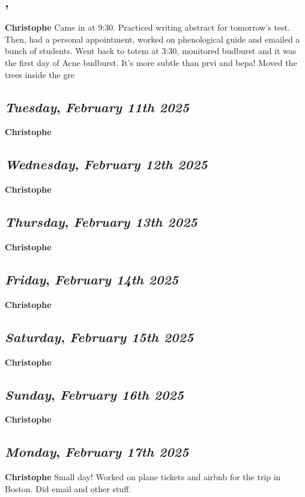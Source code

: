 \subsection*{\weekday, \day}
\textbf {Christophe}
Came in at 9:30. Practiced writing abstract for tomorrow's test. Then, had a personal appointment, worked on phenological guide and emailed a bunch of students. Went back to totem at 3:30, monitored budburst and it was the first day of Acne budburst. It's more subtle than prvi and bepa! Moved the trees inside the gre
\def\day{\textit{February 11th 2025}}
\def\weekday{\textit{Tuesday}}
\subsection*{\weekday, \day}
\textbf {Christophe}

\def\day{\textit{February 12th 2025}}
\def\weekday{\textit{Wednesday}}
\subsection*{\weekday, \day}
\textbf {Christophe}

\def\day{\textit{February 13th 2025}}
\def\weekday{\textit{Thursday}}
\subsection*{\weekday, \day}
\textbf {Christophe}

\def\day{\textit{February 14th 2025}}
\def\weekday{\textit{Friday}}
\subsection*{\weekday, \day}
\textbf {Christophe}

\def\day{\textit{February 15th 2025}}
\def\weekday{\textit{Saturday}}
\subsection*{\weekday, \day}
\textbf {Christophe}

\def\day{\textit{February 16th 2025}}
\def\weekday{\textit{Sunday}}
\subsection*{\weekday, \day}
\textbf {Christophe}

\def\day{\textit{February 17th 2025}}
\def\weekday{\textit{Monday}}
\subsection*{\weekday, \day}
\textbf {Christophe}
Small day! Worked on plane tickets and airbnb for the trip in Boston. Did email and other stuff.

